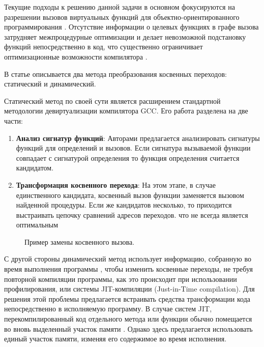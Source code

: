Текущие подходы к решению данной задачи в основном фокусируются на разрешении вызовов виртуальных функций для объектно-ориентированного программирования \cite{namolaru2006devirtualization,padlewski2017devirtualization}. Отсутствие информации о целевых функциях в графе вызова затрудняет межпроцедурные оптимизации и делает невозможной подстановку функций непосредственно в код, что существенно ограничивает оптимизационные возможности компилятора \cite{li2010lightweight,pande1996data}.


В статье \cite{chernonog2023статический} описывается два метода преобразования косвенных переходов: статический и динамический.  

Статический метод по своей сути является расширением стандартной методологии девиртуализации компилятора GCC. Его работа разделена на две части:

\begin{enumerate}
	\item \textbf{Анализ сигнатур функций}: Авторами предлагается анализировать сигнатуры функций для определений и вызовов. Если сигнатура вызываемой функции совпадает с сигнатурой определения то функция определения считается кандидатом.
	\item \textbf{Трансформация косвенного перехода}: На этом этапе, в случае единственного кандидата, косвенный вызов функции заменяется вызовом найденной процедуры. Если же кандидатов несколько, то приходится выстраивать цепочку сравнений адресов переходов. что не всегда является оптимальным
\end{enumerate}


\begin{figure}[ht]
	\caption{Пример замены косвенного вызова.}\label{fig:ICP1}
\end{figure}

С другой стороны динамический метод использует информацию, собранную во время выполнения программы \cite{baev2015profile,ishizaki2000study}, чтобы изменить косвенные переходы, не требуя повторной компиляции программы, как это происходит при использовании профилирования, или системы JIT-компиляции (Just-in-Time compilation). Для решения этой проблемы предлагается встраивать средства трансформации кода непосредственно в исполняемую программу. В случае систем JIT, перекомпилированный код отдельного метода или функции обычно помещается во вновь выделенный участок памяти \cite{cravvford1988study}. Однако здесь предлагается использовать единый участок памяти, изменяя его содержимое во время исполнения.

